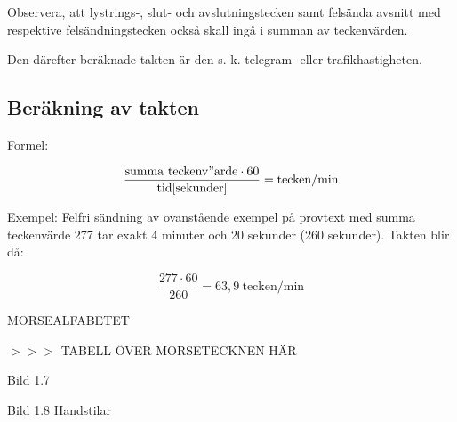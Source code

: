 Observera, att lystrings-, slut- och avslutningstecken samt felsända avsnitt med
respektive felsändningstecken också skall ingå i summan av teckenvärden.

Den därefter beräknade takten är den s. k. telegram- eller trafikhastigheten.

\subsection{Beräkning av takten}

Formel:

$$\frac{\mathrm{summa\ teckenv"arde }\cdot 60}{\mathrm{tid} [\mathrm{sekunder}]}
= \mathrm{tecken/min}$$

Exempel: Felfri sändning av ovanstående exempel på provtext med summa
teckenvärde 277 tar exakt 4 minuter och 20 sekunder (260 sekunder). Takten blir
då:

$$\frac{277 \cdot 60}{260} = 63,9\ \mathrm{tecken/min}$$

MORSEALFABETET

$>>>$ TABELL ÖVER MORSETECKNEN HÄR

Bild 1.7

Bild 1.8 Handstilar
